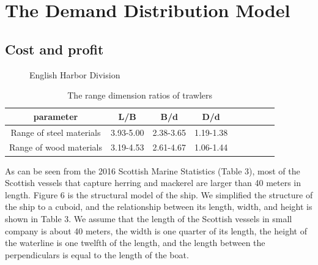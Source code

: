 \documentclass{mcmthesis}
\begin{document}
\section{The Demand Distribution Model}
\subsection{Cost and profit}
\begin{figure}[h]
  \caption{English Harbor Division}\label{figure1}
\end{figure}

\begin{table}[!htb]
\centering
\setlength{\abovecaptionskip}{0pt}%
\setlength{\belowcaptionskip}{15pt}%
\caption{The range dimension ratios of  trawlers}
\begin{tabular}{ccccccccc}
\toprule[1.5pt]
parameter &L/B&B/d&D/d\\
\toprule[1.5pt]
Range of steel materials&3.93-5.00&2.38-3.65&1.19-1.38\\
Range of wood materials&3.19-4.53&2.61-4.67&1.06-1.44\\
\bottomrule[1.5pt]
\end{tabular}
\end{table}

As can be seen from the 2016 Scottish Marine Statistics (Table 3), most of the Scottish vessels that capture herring and mackerel are larger than 40 meters in length. Figure 6 is the structural model of the ship. We simplified the structure of the ship to a cuboid, and the relationship between its length, width, and height is shown in Table 3. We assume that the length of the Scottish vessels in small company is about 40 meters, the width is one quarter of its length, the height of the waterline is one twelfth of the length, and the length between the  perpendiculars  is equal to the length of the boat.
\end{document}

